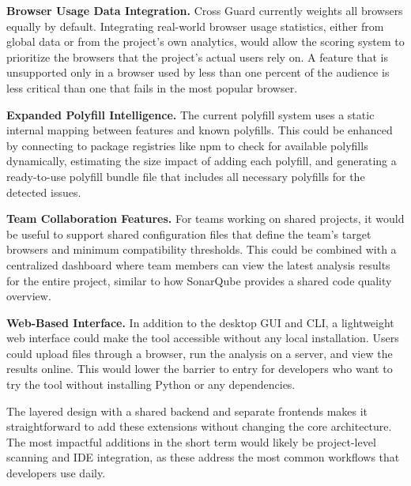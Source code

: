 \textbf{Browser Usage Data Integration.} Cross Guard currently weights all browsers equally by default. Integrating real-world browser usage statistics, either from global data or from the project's own analytics, would allow the scoring system to prioritize the browsers that the project's actual users rely on. A feature that is unsupported only in a browser used by less than one percent of the audience is less critical than one that fails in the most popular browser.

\textbf{Expanded Polyfill Intelligence.} The current polyfill system uses a static internal mapping between features and known polyfills. This could be enhanced by connecting to package registries like npm to check for available polyfills dynamically, estimating the size impact of adding each polyfill, and generating a ready-to-use polyfill bundle file that includes all necessary polyfills for the detected issues.

\textbf{Team Collaboration Features.} For teams working on shared projects, it would be useful to support shared configuration files that define the team's target browsers and minimum compatibility thresholds. This could be combined with a centralized dashboard where team members can view the latest analysis results for the entire project, similar to how SonarQube provides a shared code quality overview.

\textbf{Web-Based Interface.} In addition to the desktop GUI and CLI, a lightweight web interface could make the tool accessible without any local installation. Users could upload files through a browser, run the analysis on a server, and view the results online. This would lower the barrier to entry for developers who want to try the tool without installing Python or any dependencies.

The layered design with a shared backend and separate frontends makes it straightforward to add these extensions without changing the core architecture. The most impactful additions in the short term would likely be project-level scanning and IDE integration, as these address the most common workflows that developers use daily.
